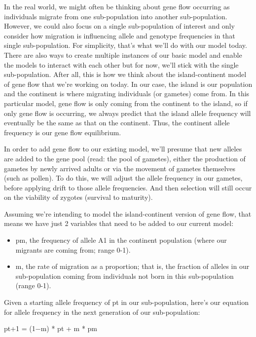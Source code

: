 In the real world, we might often be thinking about gene flow occurring
as individuals migrate from one sub-population into another
sub-population. However, we could also focus on a single sub-population
of interest and only consider how migration is influencing allele and
genotype frequencies in that single sub-population. For simplicity,
that's what we'll do with our model today. There are also ways to create
multiple instances of our basic model and enable the models to interact
with each other but for now, we'll stick with the single sub-population.
After all, this is how we think about the island-continent model of gene
flow that we're working on today. In our case, the island is our
population and the continent is where migrating individuals (or gametes)
come from. In this particular model, gene flow is only coming from the
continent to the island, so if only gene flow is occurring, we always
predict that the island allele frequency will eventually be the same as
that on the continent. Thus, the continent allele frequency is our gene
flow equilibrium.

In order to add gene flow to our existing model, we'll presume that new
alleles are added to the gene pool (read: the pool of gametes), either
the production of gametes by newly arrived adults or via the movement of
gametes themselves (such as pollen). To do this, we will adjust the
allele frequency in our gametes, before applying drift to those allele
frequencies. And then selection will still occur on the viability of
zygotes (survival to maturity).

Assuming we're intending to model the island-continent version of gene
flow, that means we have just 2 variables that need to be added to our
current model:

\begin{itemize}
\tightlist
\item
  pm, the frequency of allele A1 in the continent population (where our
  migrants are coming from; range 0-1).
\item
  m, the rate of migration as a proportion; that is, the fraction of
  alleles in our sub-population coming from individuals not born in this
  sub-population (range 0-1).
\end{itemize}

Given a starting allele frequency of pt in our sub-population, here's
our equation for allele frequency in the next generation of our
sub-population:

pt+1 = (1−m) * pt + m * pm

